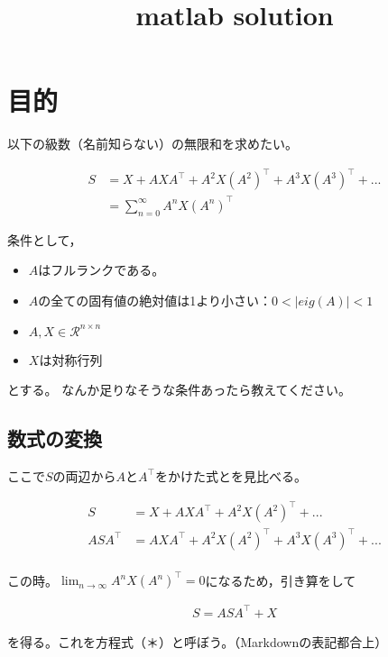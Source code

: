 \documentclass[11pt]{jsarticle}
\title{matlab solution}
\providecommand{\tightlist}{%
      \setlength{\itemsep}{0pt}\setlength{\parskip}{0pt}}
\begin{document}
    
    
    \maketitle
    
    

    
    \section{目的}\label{ux76eeux7684}

以下の級数（名前知らない）の無限和を求めたい。

\begin{align}
S &= X + AXA^\top + A^2 X (A^2)^\top + A^3 X (A^3)^\top +...\\
  &= \sum^{\infty}_{n=0} A^n X (A^n)^\top
\end{align}

条件として，

\begin{itemize}
\tightlist
\item
  \(A\)はフルランクである。
\item
  \(A\)の全ての固有値の絶対値は1より小さい：\(0<|eig(A)|<1\)
\item
  \(A,X \in \mathcal{R}^{n\times n}\)
\item
  \(X\)は対称行列
\end{itemize}

とする。 なんか足りなそうな条件あったら教えてください。

    \subsection{数式の変換}\label{ux6570ux5f0fux306eux5909ux63db}

ここで\(S\)の両辺から\(A\)と\(A^\top\)をかけた式とを見比べる。

\begin{align}
S &= X + AXA^\top + A^2 X (A^2)^\top + ...\\
ASA^\top &= AXA^\top +  A^2 X (A^2)^\top +  A^3 X (A^3)^\top + ...\\
\end{align}

この時。\(\lim_{n\rightarrow \infty}A^nX(A^n)^\top=0\)になるため，引き算をして

\begin{align}
S = ASA^\top + X \label{eq:SASAX}
\end{align}

を得る。これを方程式（＊）と呼ぼう。（Markdownの表記都合上）
\end{document}
